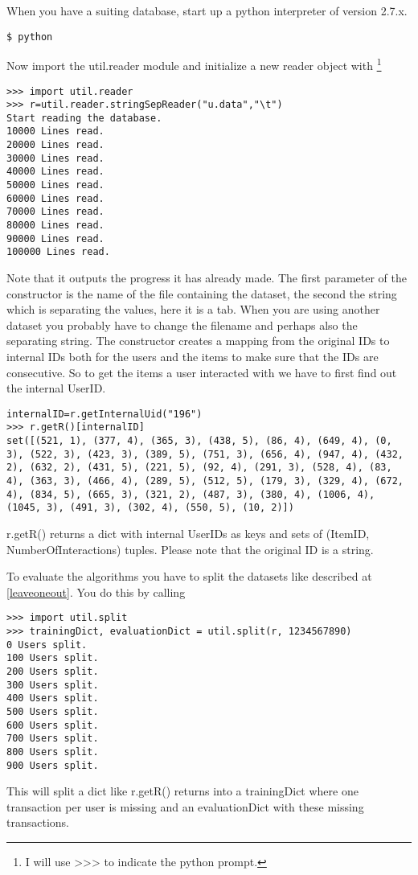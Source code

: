 When you have a suiting database, start up a python interpreter of version 2.7.x.
\begin{lstlisting}
$ python
\end{lstlisting}

Now import the util.reader module and initialize a new reader object with
\footnote{I will use >>> to indicate the python prompt.}
\begin{lstlisting}
>>> import util.reader
>>> r=util.reader.stringSepReader("u.data","\t")
Start reading the database.
10000 Lines read.
20000 Lines read.
30000 Lines read.
40000 Lines read.
50000 Lines read.
60000 Lines read.
70000 Lines read.
80000 Lines read.
90000 Lines read.
100000 Lines read.
\end{lstlisting}
Note that it outputs the progress it has already made.
The first parameter of the constructor is the name of the file containing the dataset,
the second the string which is separating the values, here it is a tab. 
When you are using another dataset you probably have to change the filename and perhaps
also the separating string.
The constructor creates a mapping from the original IDs to internal IDs both for the users
and the items to make sure that the IDs are consecutive. So to get the items a user interacted
with we have to first find out the internal UserID.
\begin{lstlisting}
internalID=r.getInternalUid("196")
>>> r.getR()[internalID]
set([(521, 1), (377, 4), (365, 3), (438, 5), (86, 4), (649, 4), (0, 3), (522, 3), (423, 3), (389, 5), (751, 3), (656, 4), (947, 4), (432, 2), (632, 2), (431, 5), (221, 5), (92, 4), (291, 3), (528, 4), (83, 4), (363, 3), (466, 4), (289, 5), (512, 5), (179, 3), (329, 4), (672, 4), (834, 5), (665, 3), (321, 2), (487, 3), (380, 4), (1006, 4), (1045, 3), (491, 3), (302, 4), (550, 5), (10, 2)])
\end{lstlisting}
r.getR() returns a dict with internal UserIDs as keys and sets of (ItemID, NumberOfInteractions) tuples.
Please note that the original ID is a string.

To evaluate the algorithms you have to split the datasets like described at \ref{leaveoneout}.
You do this by calling
\begin{lstlisting}
>>> import util.split
>>> trainingDict, evaluationDict = util.split(r, 1234567890)
0 Users split.
100 Users split.
200 Users split.
300 Users split.
400 Users split.
500 Users split.
600 Users split.
700 Users split.
800 Users split.
900 Users split.
\end{lstlisting}
This will split a dict like r.getR() returns into a trainingDict where one transaction
per user is missing and an evaluationDict with these missing transactions.


